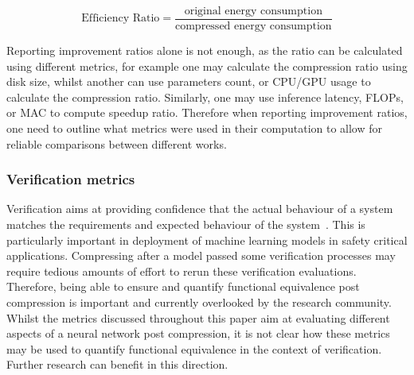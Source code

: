 \begin{equation}
  \text{Efficiency Ratio} =   \frac{\text{original energy consumption}}{\text{compressed energy consumption}}
  \label{effeciency_ratio}
\end{equation}

Reporting improvement ratios alone is not enough, as the ratio can be calculated using different metrics, for example one may calculate the compression ratio using disk size, whilst another can use parameters count, or CPU/GPU usage to calculate the compression ratio. Similarly, one may use inference latency, FLOPs, or MAC to compute speedup ratio.
%
Therefore when reporting improvement ratios, one need to outline what metrics were used in their computation to allow for reliable comparisons between different works. 

\subsubsection{Verification metrics}
Verification aims at providing confidence that the actual behaviour of a system matches the requirements and expected behaviour of the system~\cite{Chance_2020}. This is particularly important in deployment of machine learning models in safety critical applications.
%
Compressing after a model passed some verification processes may require tedious amounts of effort to rerun these verification evaluations.
%
Therefore, being able to ensure and quantify functional equivalence post compression is important and currently overlooked by the research community. Whilst the metrics discussed throughout this paper aim at evaluating different aspects of a neural network post compression, it is not clear how these metrics may be used to quantify functional equivalence in the context of verification. Further research can benefit in this direction.   

